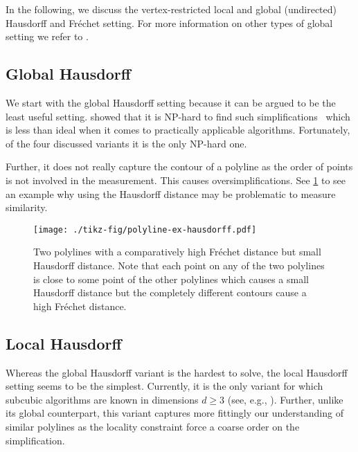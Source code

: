 In the following, we discuss the vertex-restricted local and global (undirected) Hausdorff and Fréchet setting. For more information on other types of global setting we refer to \citeauthor{global_curve_simplification}.

\subsection{Global Hausdorff}
We start with the global Hausdorff setting because it can be argued to be the least useful setting. \citeauthor{on_optimal_polyline_simplification_using_the_hausdorff_and_frechet_distance} showed that it is NP-hard to find such simplifications~\cite{on_optimal_polyline_simplification_using_the_hausdorff_and_frechet_distance} which is less than ideal when it comes to practically applicable algorithms. Fortunately, of the four discussed variants it is the only NP-hard one.

Further, it does not really capture the contour of a polyline as the order of points is not involved in the measurement. This causes oversimplifications. See \cref{fig:polyline-ex-hausdorff} to see an example why using the Hausdorff distance may be problematic to measure similarity.

\begin{figure}[b]
  \centering
  \texttt{[image: ./tikz-fig/polyline-ex-hausdorff.pdf]}
  \caption{Two polylines with a comparatively high Fréchet distance but small Hausdorff distance. Note that each point on any of the two polylines is close to some point of the other polylines which causes a small Hausdorff distance but the completely different contours cause a high Fréchet distance.}
  \label{fig:polyline-ex-hausdorff}
\end{figure}


\subsection{Local Hausdorff}
Whereas the global Hausdorff variant is the hardest to solve, the local Hausdorff setting seems to be the simplest. Currently, it  is the only variant for which subcubic algorithms are known in dimensions \(d \geq 3\) (see, e.g., \cite{efficiently_approximating_higher_dim}). Further, unlike its global counterpart, this variant captures more fittingly our understanding of similar polylines as the locality constraint force a coarse order on the simplification.

